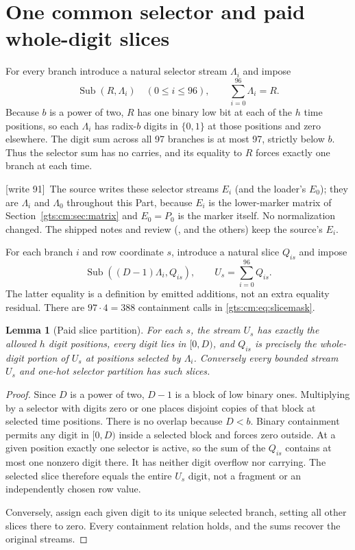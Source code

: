 \documentclass[11pt,letterpaper]{article}
\newtheorem{lemma}[theorem]{Lemma}
\theoremstyle{definition}
\theoremstyle{remark}
\newcommand{\Sub}{\operatorname{Sub}}
\newcommand{\wtagd}{\textup{[write 91]}}
\begin{document}
\section{One common selector and paid whole-digit slices}
\label{gts:cm:sec:slices}
For every branch introduce a natural selector stream $\Lambda_i$ and impose
\begin{equation}\label{gts:cm:eq:selectors}
 \Sub(R,\Lambda_i)\quad(0\le i\le96),\qquad \sum_{i=0}^{96}\Lambda_i=R.
\end{equation}
Because $b$ is a power of two, $R$ has one binary low bit at each of the $h$ time positions, so each $\Lambda_i$ has radix-$b$ digits in $\{0,1\}$ at those positions and zero elsewhere. The digit sum across all 97 branches is at most 97, strictly below $b$. Thus the selector sum has no carries, and its equality to $R$ forces exactly one branch at each time.

\wtagd\ The source writes these selector streams $E_i$ (and the loader's $E_0$); they are $\Lambda_i$ and $\Lambda_0$ throughout this Part, because $E_i$ is the lower-marker matrix of Section~\ref{gts:cm:sec:matrix} and $E_0=P_0$ is the marker itself. No normalization changed. The shipped notes and review (,  and the others) keep the source's $E_i$.

For each branch $i$ and row coordinate $s$, introduce a natural slice $Q_{is}$ and impose
\begin{equation}\label{gts:cm:eq:slicemask}
 \Sub((D-1)\Lambda_i,Q_{is}),\qquad
 U_s=\sum_{i=0}^{96}Q_{is}.
\end{equation}
The latter equality is a definition by emitted additions, not an extra equality residual. There are $97\cdot4=388$ containment calls in \eqref{gts:cm:eq:slicemask}.

\begin{lemma}[Paid slice partition]\label{gts:cm:lem:slices}
For each $s$, the stream $U_s$ has exactly the allowed $h$ digit positions, every digit lies in $[0,D)$, and $Q_{is}$ is precisely the whole-digit portion of $U_s$ at positions selected by $\Lambda_i$. Conversely every bounded stream $U_s$ and one-hot selector partition has such slices.
\end{lemma}
\begin{proof}
Since $D$ is a power of two, $D-1$ is a block of low binary ones. Multiplying by a selector with digits zero or one places disjoint copies of that block at selected time positions. There is no overlap because $D<b$. Binary containment permits any digit in $[0,D)$ inside a selected block and forces zero outside. At a given position exactly one selector is active, so the sum of the $Q_{is}$ contains at most one nonzero digit there. It has neither digit overflow nor carrying. The selected slice therefore equals the entire $U_s$ digit, not a fragment or an independently chosen row value.

Conversely, assign each given digit to its unique selected branch, setting all other slices there to zero. Every containment relation holds, and the sums recover the original streams.
\end{proof}
\end{document}

